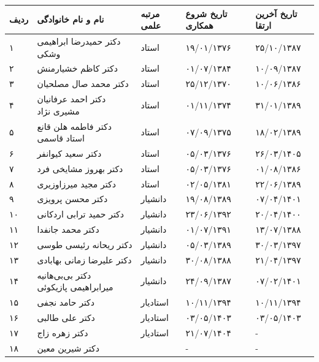 \documentclass[
  letterpaper,
  DIV=11,
  numbers=noendperiod]{scrreprt}
\newcounter{none} %
\begin{document}
{\def\LTcaptype{none} %
\begin{longtable}[]{@{}
  >{\raggedright\arraybackslash}p{}
  >{\raggedright\arraybackslash}p{}
  >{\raggedright\arraybackslash}p{}
  >{\raggedright\arraybackslash}p{}
  >{\raggedright\arraybackslash}p{}@{}}
\toprule\noalign{}
\begin{minipage}[b]{\linewidth}\raggedright
ردیف
\end{minipage} & \begin{minipage}[b]{\linewidth}\raggedright
نام و نام خانوادگی
\end{minipage} & \begin{minipage}[b]{\linewidth}\raggedright
مرتبه علمی
\end{minipage} & \begin{minipage}[b]{\linewidth}\raggedright
تاریخ شروع همکاری
\end{minipage} & \begin{minipage}[b]{\linewidth}\raggedright
تاریخ آخرین ارتقا
\end{minipage} \\
\midrule\noalign{}
\endhead
\bottomrule\noalign{}
\endlastfoot
۱ & دکتر حمیدرضا ابراهیمی وشکی & استاد & ۱۹/۰۱/۱۳۷۶ & ۲۵/۱۰/۱۳۸۷ \\
۲ & دکتر کاظم خشیارمنش & استاد & ۰۱/۰۷/۱۳۸۴ & ۱۰/۰۹/۱۳۸۷ \\
۳ & دکتر محمد صال مصلحیان & استاد & ۲۵/۱۲/۱۳۷۰ & ۱۰/۰۶/۱۳۸۶ \\
۴ & دکتر احمد عرفانیان مشیری نژاد & استاد & ۰۱/۱۱/۱۳۷۴ & ۳۱/۰۱/۱۳۸۹ \\
۵ & دکتر فاطمه هلن قانع استاد قاسمی & استاد & ۰۷/۰۹/۱۳۷۵ & ۱۸/۰۲/۱۳۸۹ \\
۶ & دکتر سعید کیوانفر & استاد & ۰۵/۰۳/۱۳۷۶ & ۲۶/۰۳/۱۴۰۵ \\
۷ & دکتر بهروز مشایخی فرد & استاد & ۰۵/۰۳/۱۳۷۶ & ۰۱/۰۸/۱۳۸۶ \\
۸ & دکتر مجید میرزاوزیری & استاد & ۰۲/۰۵/۱۳۸۱ & ۲۲/۰۶/۱۳۸۹ \\
۹ & دکتر محسن پرویزی & دانشیار & ۱۹/۰۸/۱۳۸۹ & ۰۷/۰۴/۱۴۰۱ \\
۱۰ & دکتر حمید ترابی اردکانی & دانشیار & ۲۳/۰۶/۱۳۹۲ & ۲۰/۰۴/۱۴۰۰ \\
۱۱ & دکتر محمد جانفدا & دانشیار & ۰۱/۰۷/۱۳۹۱ & ۱۳/۰۷/۱۳۸۸ \\
۱۲ & دکتر ریحانه رئیسی طوسی & دانشیار & ۰۵/۰۳/۱۳۸۹ & ۳۰/۰۳/۱۳۹۷ \\
۱۳ & دکتر علیرضا زمانی بهابادی & دانشیار & ۳۰/۰۸/۱۳۸۸ & ۲۱/۰۴/۱۳۹۷ \\
۱۴ & دکتر بی‌بی‌هانیه میرابراهیمی پازیکوئی & دانشیار & ۲۴/۰۹/۱۳۸۷ &
۰۷/۰۲/۱۴۰۱ \\
۱۵ & دکتر حامد نجفی & استادیار & ۱۰/۱۱/۱۳۹۴ & ۱۰/۱۱/۱۳۹۴ \\
۱۶ & دکتر علی طالبی & استادیار & ۰۳/۰۵/۱۴۰۳ & ۰۳/۰۵/۱۴۰۳ \\
۱۷ & دکتر زهره زاج & استادیار & ۲۱/۰۷/۱۴۰۴ & - \\
۱۸ & دکتر شیرین معین & & - & - \\
\end{longtable}
}
\end{document}

